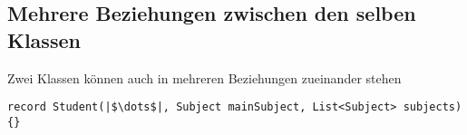 \documentclass[a4paper]{scrartcl}
\begin{document}
\subsection*{Mehrere Beziehungen zwischen den selben Klassen}
Zwei Klassen können auch in mehreren Beziehungen zueinander stehen
\begin{verbatim}
record Student(|$\dots$|, Subject mainSubject, List<Subject> subjects){}
\end{verbatim}


\begin{center}
\end{center}
\end{document}
